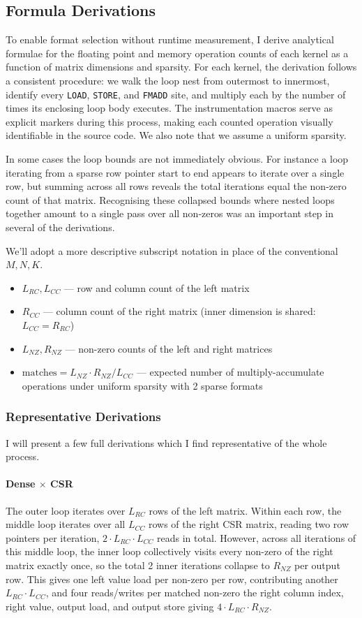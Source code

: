 \subsection{Formula Derivations}
To enable format selection without runtime measurement, I derive analytical formulae for the floating point and memory operation counts of each kernel as a function of matrix dimensions and sparsity. For each kernel, the derivation follows a consistent procedure: we walk the loop nest from outermost to innermost, identify every \texttt{LOAD}, \texttt{STORE}, and \texttt{FMADD} site, and multiply each by the number of times its enclosing loop body executes. The instrumentation macros serve as explicit markers during this process, making each counted operation visually identifiable in the source code. We also note that we assume a uniform sparsity.

In some cases the loop bounds are not immediately obvious. For instance a loop iterating from a sparse row pointer start to end appears to iterate over a single row, but summing across all rows reveals the total iterations equal the non-zero count of that matrix. Recognising these collapsed bounds where nested loops together amount to a single pass over all non-zeros was an important step in several of the derivations.

We'll adopt a more descriptive subscript notation in place of the conventional $M, N, K$.
\begin{itemize}
    \item $L_{RC}, L_{CC}$ --- row and column count of the left matrix
    \item $R_{CC}$ --- column count of the right matrix (inner dimension is shared: $L_{CC} = R_{RC}$)
    \item $L_{NZ}, R_{NZ}$ --- non-zero counts of the left and right matrices
    \item $\text{matches} = L_{NZ} \cdot R_{NZ} / L_{CC}$ --- expected number of multiply-accumulate operations under uniform sparsity with 2 sparse formats
\end{itemize}
\subsubsection*{Representative Derivations}
I will present a few full derivations which I find representative of the whole process.

\paragraph{Dense $\times$ CSR}
The outer loop iterates over $L_{RC}$ rows of the left matrix. Within each row, the middle
loop iterates over all $L_{CC}$ rows of the right CSR matrix, reading two row pointers per
iteration, $2 \cdot L_{RC} \cdot L_{CC}$ reads in total. However, across all iterations of
this middle loop, the inner loop collectively visits every non-zero of the right matrix exactly
once, so the total 2 inner iterations collapse to $R_{NZ}$ per output row. This gives one left
value load per non-zero per row, contributing another $L_{RC} \cdot L_{CC}$, and four reads/writes
per matched non-zero the right column index, right value, output load, and output store
giving $4 \cdot L_{RC} \cdot R_{NZ}$.

